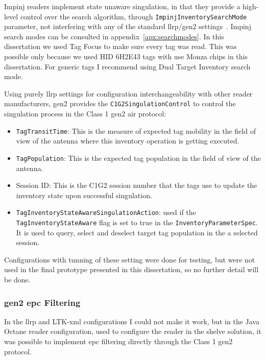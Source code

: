 Impinj readers implement state unaware singulation, in that they provide a high-level control over the search algorithm, through \texttt{ImpinjInventorySearchMode} parameter, not interfering with any of the standard \ac{llrp}/\ac{gen2} settings~\cite{ImpinjOctaneLLRP, UnderstandingEPCGen2}.
Impinj search modes can be consulted in appendix~\ref{apx:searchmodes}.
In this dissertation we used Tag Focus to make sure every tag was read. This was possible only because we used HID 6H2E43 tags with use Monza chips in this dissertation. For generic tags I recommend using Dual Target Inventory search mode.

Using purely \ac{llrp} settings for configuration interchangeability with other reader manufacturers, \ac{gen2} provides the \texttt{C1G2SingulationControl} to control the singulation process in the Class 1 \ac{gen2} air protocol:

\begin{itemize}
    \item \texttt{TagTransitTime}: This is the measure of expected tag mobility in the field of view of the antenna where this inventory operation is getting executed.
    \item \texttt{TagPopulation}: This is the expected tag population in the field of view of the antenna.
    \item Session ID: This is the C1G2 session number that the tags use to update the inventory state upon successful singulation.
    \item \texttt{TagInventoryStateAwareSingulationAction}: used if the \texttt{TagInventoryStateAware} flag is set to true in the \texttt{InventoryParameterSpec}. It is used to query, select and deselect target tag population in the a selected session.
\end{itemize}

Configurations with tunning of these setting were done for testing, but were not used in the final prototype presented in this dissertation, so no further detail will be done.

\subsubsection{\ac{gen2} \ac{epc} Filtering}

In the \ac{llrp} and LTK-\ac{xml} configurations I could not make it work, but in the Java Octane reader configuration, used to configure the reader in the shelve solution, it was possible to implement \ac{epc} filtering directly through the Class 1 \ac{gen2} protocol.

